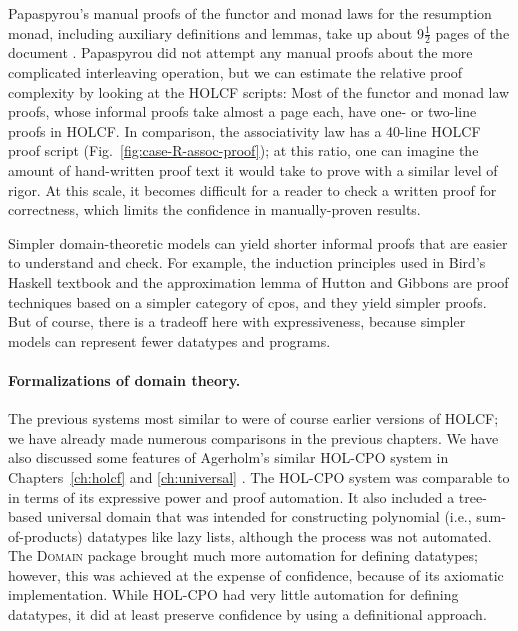 Papaspyrou's manual proofs of the functor and monad laws for the resumption monad, including auxiliary definitions and lemmas, take up about 9$\frac{1}{2}$ pages of the document \cite{Papaspyrou2001tech}. Papaspyrou did not attempt any manual proofs about the more complicated interleaving operation, but we can estimate the relative proof complexity by looking at the HOLCF scripts: Most of the functor and monad law proofs, whose informal proofs take almost a page each, have one- or two-line proofs in HOLCF. In comparison, the associativity law  has a 40-line HOLCF proof script (Fig.~\ref{fig:case-R-assoc-proof}); at this ratio, one can imagine the amount of hand-written proof text it would take to prove  with a similar level of rigor. At this scale, it becomes difficult for a reader to check a written proof for correctness, which limits the confidence in manually-proven results.

Simpler domain-theoretic models can yield shorter informal proofs that are easier to understand and check. For example, the induction principles used in Bird's Haskell textbook \cite{Bird1998Introduction} and the approximation lemma of Hutton and Gibbons \cite{Hutton01} are proof techniques based on a simpler category of cpos, and they yield simpler proofs. But of course, there is a tradeoff here with expressiveness, because simpler models can represent fewer datatypes and programs.

\paragraph{Formalizations of domain theory.}

The previous systems most similar to  were of course earlier versions of HOLCF; we have already made numerous comparisons in the previous chapters. We have also discussed some features of Agerholm's similar HOL-CPO system in Chapters~\ref{ch:holcf} and \ref{ch:universal} \cite{agerholm94thesis}. The HOL-CPO system was comparable to  in terms of its expressive power and proof automation. It also included a tree-based universal domain that was intended for constructing polynomial (i.e., sum-of-products) datatypes like lazy lists, although the process was not automated. The  \textsc{Domain} package brought much more automation for defining datatypes; however, this was achieved at the expense of confidence, because of its axiomatic implementation. While HOL-CPO had very little automation for defining datatypes, it did at least preserve confidence by using a definitional approach.


